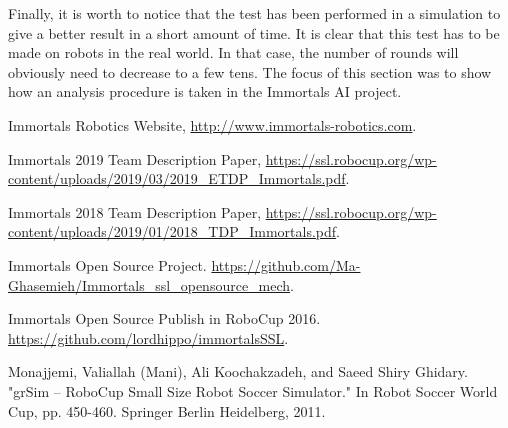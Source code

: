 \documentclass[runningheads]{llncs}
\begin{document}
Finally, it is worth to notice that the test has been performed in a simulation to give a better result in a short amount of time. It is clear that this test has to be made on robots in the real world. In that case, the number of rounds will obviously need to decrease to a few tens. The focus of this section was to show how an analysis procedure is taken in the Immortals AI project.

%






\newpage
\begin{thebibliography}{8}
Immortals Robotics Website, \url{http://www.immortals-robotics.com}.

Immortals 2019 Team Description Paper, \url{https://ssl.robocup.org/wp-content/uploads/2019/03/2019\_ETDP\_Immortals.pdf}.

Immortals 2018 Team Description Paper, \url{https://ssl.robocup.org/wp-content/uploads/2019/01/2018\_TDP\_Immortals.pdf}.

Immortals Open Source Project. \url{https://github.com/Ma-Ghasemieh/Immortals\_ssl\_opensource\_mech}.

Immortals Open Source Publish in RoboCup 2016. \url{https://github.com/lordhippo/immortalsSSL}.

Monajjemi, Valiallah (Mani), Ali Koochakzadeh, and Saeed Shiry Ghidary. "grSim – RoboCup Small Size Robot Soccer Simulator." In Robot Soccer World Cup, pp. 450-460. Springer Berlin Heidelberg, 2011.

\end{thebibliography}
\end{document}
